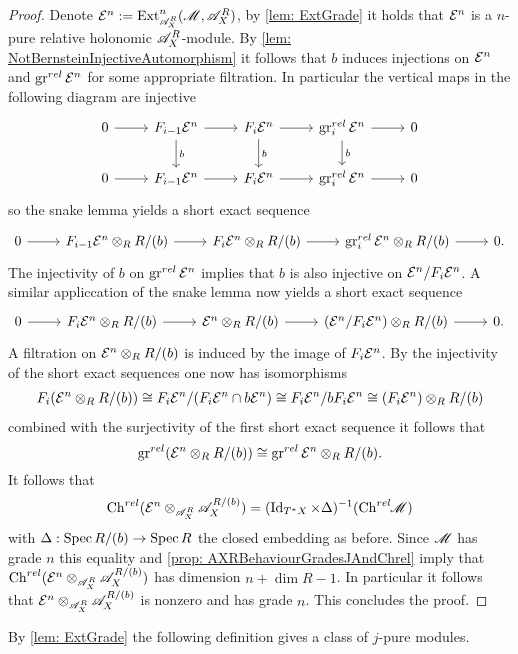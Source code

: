 \begin{proof}
  Denote $\E^n := \Ex{\A_X^R}{n}(\M,\A_X^R)$, by \cref{lem: ExtGrade} it holds that $\mathcal{E}^n$ is a $n$-pure relative holonomic $\mathscr{A}_X^R$-module.
  By \cref{lem: NotBernsteinInjectiveAutomorphism} it follows that $b$ induces injections on $\mathcal{E}^{n}$ and $\operatorname{gr}^{rel} \mathcal{E}^{n}$ for some appropriate filtration.
  In particular the vertical maps in the following diagram are injective
  $$\begin{tikzcd}
    0 \arrow{r} & F_{i-1} \E^n\arrow{r} \arrow{d}{b}& F_i \E^{n}\arrow{r} \arrow{d}{b}& \gr^{rel}_i \E^n\arrow{r}\arrow{d}{b} & 0\\
    0 \arrow{r} & F_{i-1} \E^n\arrow{r} & F_i \E^{n}\arrow{r} & \gr^{rel}_i \E^n\arrow{r} & 0
  \end{tikzcd} $$
  so the snake lemma yields a short exact sequence
  $$\begin{tikzcd}
    0 \arrow{r} & F_{i-1} \E^n\otimes_R R/(b)\arrow{r} & F_i \E^{n}\otimes_R R/(b)\arrow{r} & \gr^{rel}_i \E^n\arrow{r}\otimes_R R/(b) & 0.
  \end{tikzcd} $$
  The injectivity of $b$ on $\operatorname{gr}^{rel}\mathcal{E}^n$ implies that $b$ is also injective on $\mathcal{E}^n/F_i\mathcal{E}^n$. A similar appliccation of the snake lemma now yields a short exact sequence
  $$\begin{tikzcd}
    0 \arrow{r} & F_{i} \E^n\otimes_R R/(b)\arrow{r} & \E^{n}\otimes_R R/(b)\arrow{r} & (\E^n/F_i \E^n )\arrow{r}\otimes_R R/(b) & 0.
  \end{tikzcd} $$
  A filtration on $\mathcal{E}^n \otimes_R R/(b)$ is induced by the image of $F_i\mathcal{E}^n$. By the injectivity of the short exact sequences one now has isomorphisms
  \begin{align*}
    F_i(\mathcal{E}^n \otimes_R R/(b)) \cong F_i\mathcal{E}^n / (F_i \mathcal{E}^n \cap b\mathcal{E}^n) \cong F_i \mathcal{E}^n / b F_i \mathcal{E}^n \cong  (F_i\mathcal{E}^n) \otimes_R R/(b)
  \end{align*}
  combined with the surjectivity of the first short exact sequence it follows that
  $$\operatorname{gr}^{rel}(\mathcal{E}^n \otimes_R R/(b)) \cong \operatorname{gr}^{rel}\mathcal{E}^n \otimes_R R/(b). $$
  It follows that
  $$\operatorname{Ch}^{rel}(\mathcal{E}^n \otimes_{\mathscr{A}_X^R} \mathscr{A}_X^{R/(b)})  = (\operatorname{Id}_{T^*X} \times \Delta)^{-1}(\operatorname{Ch}^{rel}\mkern-5mu \mathscr{M})$$
  with $\Delta: \operatorname{Spec} R/(b) \to \operatorname{Spec} R$ the closed embedding as before. Since $\mathscr{M}$ has grade $n$ this equality and \cref{prop: AXRBehaviourGradesJAndChrel} imply that $\operatorname{Ch}^{rel}(\mathcal{E}^n \otimes_{\mathscr{A}_X^R} \mathscr{A}_X^{R/(b)})$ has dimension $n + \dim R - 1$.
  In particular it follows that $\mathcal{E}^n \otimes_{\mathscr{A}_X^R} \mathscr{A}_X^{R/(b)}$ is nonzero and has grade $n$. This concludes the proof.
\end{proof}
By \cref{lem: ExtGrade} the following definition gives a class of $j$-pure modules.
